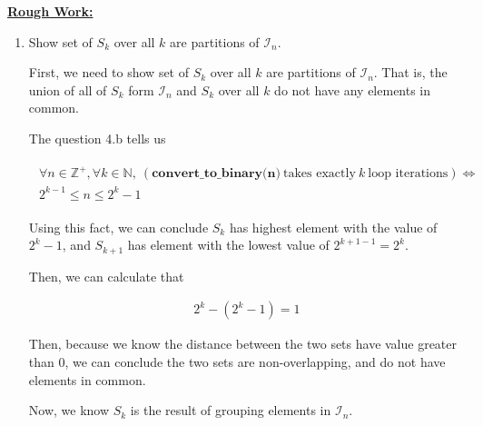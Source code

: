 \documentclass[12pt]{article}
\begin{document}
\begin{enumerate}[a.]
    \bigskip

    \begin{mdframed}

    \underline{\textbf{Rough Work:}}

    \bigskip

    \begin{enumerate}[1.]

        \item Show set of $S_k$ over all $k$ are partitions of $\mathcal{I}_n$.

        \begin{mdframed}
            First, we need to show set of $S_k$ over all $k$ are partitions of $\mathcal{I}_n$.
            That is, the union of all of $S_k$ form $\mathcal{I}_n$ and $S_k$ over all $k$ do
            not have any elements in common.

            \bigskip

            The question 4.b tells us

            \begin{align}
                \begin{split}
                \forall n \in \mathbb{Z}^+, \forall k \in \mathbb{N},\: (\textbf{
                convert\_to\_binary(n)}\:\text{takes exactly}\:k\:\text{loop iterations}) \Leftrightarrow
                \\ 2^{k-1} \leq n \leq 2^k -1
                \end{split}
            \end{align}

            Using this fact, we can conclude $S_k$ has highest element with the value of $2^k - 1$,
            and $S_{k+1}$ has element with the lowest value of $2^{k+1-1}=2^k$.

            \bigskip

            Then, we can calculate that

            \begin{align}
                2^k - (2^k - 1) = 1
            \end{align}

            \bigskip

            Then, because we know the distance between the two sets have value greater than 0, we can
            conclude the two sets are non-overlapping, and do not have elements in common.

            \bigskip

            Now, we know $S_k$ is the result of grouping elements in $\mathcal{I}_n$.


\end{mdframed}
\end{enumerate}
\end{mdframed}
\end{enumerate}
\end{document}
